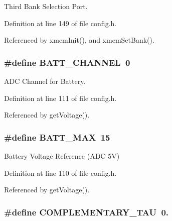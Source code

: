Third Bank Selection Port. 



Definition at line 149 of file config.\-h.



Referenced by xmem\-Init(), and xmem\-Set\-Bank().

\hypertarget{group__config_ga9fd748b19523c96052a2964d73a7b0f5}{
\subsubsection[{B\-A\-T\-T\-\_\-\-C\-H\-A\-N\-N\-E\-L}]{\setlength{\rightskip}{0pt plus 5cm}\#define B\-A\-T\-T\-\_\-\-C\-H\-A\-N\-N\-E\-L~0}}\label{group__config_ga9fd748b19523c96052a2964d73a7b0f5}


A\-D\-C Channel for Battery. 



Definition at line 111 of file config.\-h.



Referenced by get\-Voltage().

\hypertarget{group__config_gac873c87f494ea2b22e7eb5fc74ad5a82}{
\subsubsection[{B\-A\-T\-T\-\_\-\-M\-A\-X}]{\setlength{\rightskip}{0pt plus 5cm}\#define B\-A\-T\-T\-\_\-\-M\-A\-X~15}}\label{group__config_gac873c87f494ea2b22e7eb5fc74ad5a82}


Battery Voltage Reference (A\-D\-C 5\-V) 



Definition at line 110 of file config.\-h.



Referenced by get\-Voltage().

\hypertarget{group__config_ga61cd22949cc88bd899de6b20cb61e959}{
\subsubsection[{C\-O\-M\-P\-L\-E\-M\-E\-N\-T\-A\-R\-Y\-\_\-\-T\-A\-U}]{\setlength{\rightskip}{0pt plus 5cm}\#define C\-O\-M\-P\-L\-E\-M\-E\-N\-T\-A\-R\-Y\-\_\-\-T\-A\-U~0.}}\label{group__config_ga61cd22949cc88bd899de6b20cb61e959}


